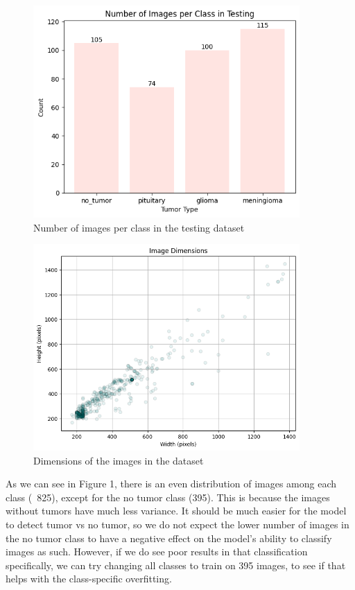 \documentclass[conference]{IEEEtran}
\begin{document}
\begin{figure}[!ht]
    \centering
    \includegraphics[width=4in]{ImagesPerClassTesting.png}
    \caption{\large Number of images per class in the testing dataset}
    \label{Number of images per class in the testing dataset}
\end{figure}

\begin{figure}[!ht]
    \centering
    \includegraphics[width=4in]{ImageDimensions.png}
    \caption{\large Dimensions of the images in the dataset}
    \label{Dimensions of images in the dataset}
\end{figure}

As we can see in Figure 1, there is an even distribution of images among each class (~825), except for the no tumor class (395). This is because the images without tumors have much less variance. It should be much easier for the model to detect tumor vs no tumor, so we do not expect the lower number of images in the no tumor class to have a negative effect on the model's ability to classify images as such. However, if we do see poor results in that classification specifically, we can try changing all classes to train on 395 images, to see if that helps with the class-specific overfitting.
\end{document}
